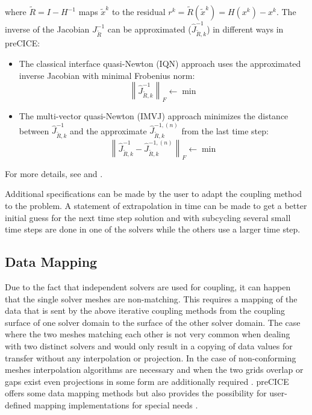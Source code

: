    where $\tilde{R} = I-H^{-1}$ maps $\tilde{x}^k$ to the residual $r^k=\tilde{R}(\tilde{x}^k)=H(x^k)-x^k$. The inverse of the Jacobian $J_{\tilde{R}}^{-1}$ can be approximated ($\hat{J}_{\tilde{R},k}^{-1}$) in different ways in preCICE:
   \begin{itemize}
   	\item The classical interface quasi-Newton (IQN) approach uses the approximated inverse Jacobian with minimal Frobenius norm:
   	\begin{equation}
   	\left\| \hat{J}_{\tilde{R},k}^{-1} \right\|_F \leftarrow \min
   	\end{equation}
   	\item The multi-vector quasi-Newton (IMVJ) approach minimizes the distance between $\hat{J}_{\tilde{R},k}^{-1}$ and the approximate $\hat{J}_{\tilde{R},k}^{-1,(n)}$ from the last time step:
   	\begin{equation}
   	\left\| \hat{J}_{\tilde{R},k}^{-1} - \hat{J}_{\tilde{R},k}^{-1,(n)}\right\|_F \leftarrow \min
   	\end{equation}
   \end{itemize}
   For more details, see \cite{bungartz2015fully} and \cite{gatzhammer2015efficient}.
   
   Additional specifications can be made by the user to adapt the coupling method to the problem. A statement of extrapolation in time can be made to get a better initial guess for the next time step solution and with subcycling several small time steps are done in one of the solvers while the others use a larger time step.
  

 \subsection{Data Mapping} %
  Due to the fact that independent solvers are used for coupling, it can happen that the single solver meshes are non-matching. This requires a mapping of the data that is sent by the above iterative coupling methods from the coupling surface of one solver domain to the surface of the other solver domain. The case where the two meshes matching each other is not very common when dealing with two distinct solvers and would only result in a copying of data values for transfer without any interpolation or projection. In the case of non-conforming meshes interpolation algorithms are necessary and when the two grids overlap or gaps exist even projections in some form are additionally required \cite{gatzhammer2015efficient}. preCICE offers some data mapping methods but also provides the possibility for user-defined mapping implementations for special needs \cite{bungartz2015fully}.
